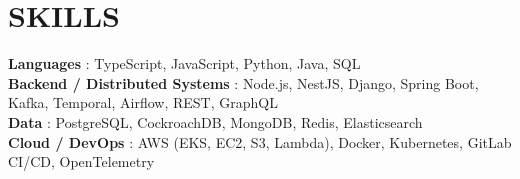 \documentclass[letterpaper,11pt]{article}
\begin{document}
\section{SKILLS}
 \begin{itemize}[leftmargin=0in, label={}]
    \small{\item{
     \textbf{Languages} {: TypeScript, JavaScript, Python, Java, SQL}\vspace{2pt} \\
     \textbf{Backend / Distributed Systems} {: Node.js, NestJS, Django, Spring Boot, Kafka, Temporal, Airflow, REST, GraphQL}\vspace{2pt} \\
     \textbf{Data} {: PostgreSQL, CockroachDB, MongoDB, Redis, Elasticsearch}\vspace{2pt} \\
     \textbf{Cloud / DevOps} {: AWS (EKS, EC2, S3, Lambda), Docker, Kubernetes, GitLab CI/CD, OpenTelemetry}
    }}
 \end{itemize}

\end{document}
